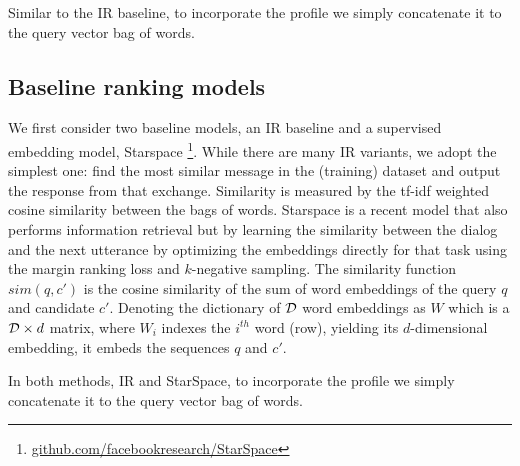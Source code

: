 Similar to the IR baseline, to incorporate the profile we simply concatenate it to the query vector bag of words. 
\else
\subsection{Baseline ranking models}
We first consider two baseline models, 
an IR baseline \cite{sordoni2015neural} and a supervised embedding model, Starspace \cite{wu2017starspace}\footnote{\url{github.com/facebookresearch/StarSpace}}. While there are many IR variants, we adopt the simplest one: find the most similar message in the (training) dataset and output the response from that exchange. Similarity is measured by the tf-idf weighted cosine similarity between the bags of words. 
Starspace is a recent model that also performs information retrieval but by learning %
the similarity
between the dialog and the next utterance by optimizing the embeddings directly for that task using the margin ranking loss and $k$-negative sampling. The similarity function $sim(q, c')$ is the cosine similarity of the sum of word embeddings of the query $q$ and candidate $c'$. Denoting the dictionary of ${\cal D}$ word embeddings as $W$ which is a ${\cal D} \times d$ matrix, where $W_i$ indexes the $i^{th}$ word (row), yielding its $d$-dimensional embedding, it embeds the sequences $q$ and $c'$.

In both methods, IR and StarSpace, to incorporate the profile we simply concatenate it to the query vector bag of words. 
\fi

